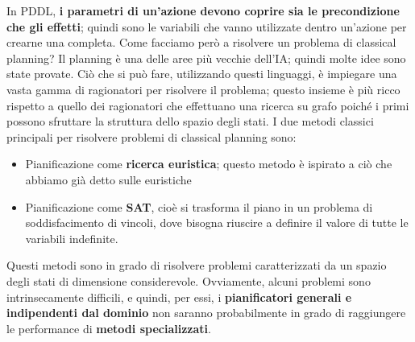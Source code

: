 \documentclass[12pt]{article}
\begin{document}
In PDDL, \textbf{i parametri di un'azione devono coprire sia le precondizione che gli effetti}; quindi sono le variabili che vanno utilizzate dentro un'azione
per crearne una completa.
Come facciamo però a risolvere un problema di classical planning?
Il planning è una delle aree più vecchie dell'IA; quindi molte idee sono state provate.
Ciò che si può fare, utilizzando questi linguaggi, è impiegare una vasta gamma di ragionatori per risolvere il problema; questo insieme è più ricco rispetto
a quello dei ragionatori che effettuano una ricerca su grafo poiché i primi possono sfruttare la struttura dello spazio degli stati.
I due metodi classici principali per risolvere problemi di classical planning sono:
\begin{itemize}
    \item Pianificazione come \textbf{ricerca euristica}; questo metodo è ispirato a ciò che abbiamo già detto sulle euristiche
    \item Pianificazione come \textbf{SAT}, cioè si trasforma il piano in un problema di soddisfacimento di vincoli, dove bisogna riuscire a definire il valore di tutte le variabili indefinite.
\end{itemize}
Questi metodi sono in grado di risolvere problemi caratterizzati da un spazio degli stati di dimensione considerevole.
Ovviamente, alcuni problemi sono intrinsecamente difficili, e quindi, per essi, i \textbf{pianificatori generali e indipendenti dal dominio} non saranno
probabilmente in grado di raggiungere le performance di \textbf{metodi specializzati}.
\end{document}
